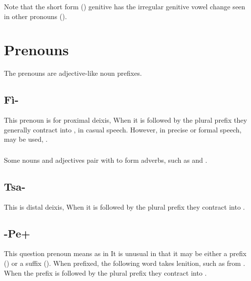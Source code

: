 \noindent Note that the short form () genitive has the
irregular genitive vowel change seen in other pronouns
().

\section{Prenouns}

\noindent The prenouns are adjective-like noun prefixes. 

\subsection{Fì-} This prenoun is for proximal deixis,   When
it is followed by the plural prefix  they generally contract
into ,  in casual speech.  However, in precise or
formal speech,  may be used, . \label{morph:prenoun:fi}
 

\subsubsection{} Some nouns and adjectives pair with  to form
adverbs, such as   and  .

\subsection{Tsa-} This is distal deixis,   When it is
followed by the plural prefix  they contract into 
. 
 

\subsection{-Pe+} \label{morph:pre:pe} This question prenoun means
 as in    It is unusual in
that it may be either a prefix () or a suffix ().
When prefixed, the following word takes lenition, such as 
from .  When the prefix is followed by the plural
prefix  they contract into .

